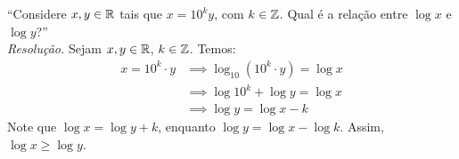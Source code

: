 \enquote{Considere $x, y \in \mathbb R$ tais que $x = 10^ky$, com $k \in \mathbb Z$. Qual é a relação entre $\log x$ e $\log y$?} \\
\emph{Resolução.}
Sejam $x, y \in \mathbb R$, $k \in \mathbb Z$. Temos:
\begin{align*}
    x = 10^k \cdot y & \implies
    \log_{10} (10^k\cdot y) = \log x \\ &\implies \log 10^k + \log y = \log x \\ & \implies
    \log y = \log x - k
\end{align*}
Note que $\log x = \log y + k$, enquanto $\log y = \log x - \log k$. Assim, $\log x \ge \log y$.